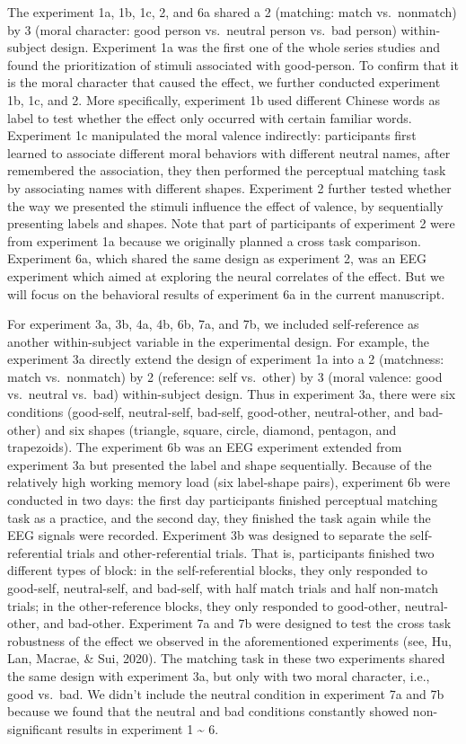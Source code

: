 \documentclass[
  english,
  man]{apa6}
\begin{document}
The experiment 1a, 1b, 1c, 2, and 6a shared a 2 (matching: match vs.~nonmatch) by 3 (moral character: good person vs.~neutral person vs.~bad person) within-subject design. Experiment 1a was the first one of the whole series studies and found the prioritization of stimuli associated with good-person. To confirm that it is the moral character that caused the effect, we further conducted experiment 1b, 1c, and 2. More specifically, experiment 1b used different Chinese words as label to test whether the effect only occurred with certain familiar words. Experiment 1c manipulated the moral valence indirectly: participants first learned to associate different moral behaviors with different neutral names, after remembered the association, they then performed the perceptual matching task by associating names with different shapes. Experiment 2 further tested whether the way we presented the stimuli influence the effect of valence, by sequentially presenting labels and shapes. Note that part of participants of experiment 2 were from experiment 1a because we originally planned a cross task comparison. Experiment 6a, which shared the same design as experiment 2, was an EEG experiment which aimed at exploring the neural correlates of the effect. But we will focus on the behavioral results of experiment 6a in the current manuscript.

For experiment 3a, 3b, 4a, 4b, 6b, 7a, and 7b, we included self-reference as another within-subject variable in the experimental design. For example, the experiment 3a directly extend the design of experiment 1a into a 2 (matchness: match vs.~nonmatch) by 2 (reference: self vs.~other) by 3 (moral valence: good vs.~neutral vs.~bad) within-subject design. Thus in experiment 3a, there were six conditions (good-self, neutral-self, bad-self, good-other, neutral-other, and bad-other) and six shapes (triangle, square, circle, diamond, pentagon, and trapezoids). The experiment 6b was an EEG experiment extended from experiment 3a but presented the label and shape sequentially. Because of the relatively high working memory load (six label-shape pairs), experiment 6b were conducted in two days: the first day participants finished perceptual matching task as a practice, and the second day, they finished the task again while the EEG signals were recorded. Experiment 3b was designed to separate the self-referential trials and other-referential trials. That is, participants finished two different types of block: in the self-referential blocks, they only responded to good-self, neutral-self, and bad-self, with half match trials and half non-match trials; in the other-reference blocks, they only responded to good-other, neutral-other, and bad-other. Experiment 7a and 7b were designed to test the cross task robustness of the effect we observed in the aforementioned experiments (see, Hu, Lan, Macrae, \& Sui, 2020). The matching task in these two experiments shared the same design with experiment 3a, but only with two moral character, i.e., good vs.~bad. We didn't include the neutral condition in experiment 7a and 7b because we found that the neutral and bad conditions constantly showed non-significant results in experiment 1 \textasciitilde{} 6.
\end{document}
